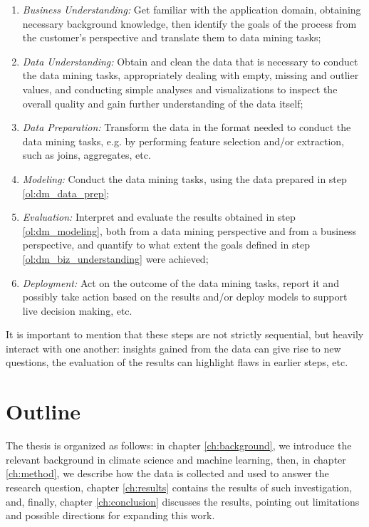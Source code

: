 \documentclass[a4paper]{book}
\begin{document}
\begin{enumerate}
\item \emph{Business Understanding:} Get familiar with the application domain, obtaining necessary background knowledge, then identify the goals of the process from the customer's perspective and translate them to data mining tasks;
\label{ol:dm_biz_understanding}

\item \emph{Data Understanding:} Obtain and clean the data that is necessary to conduct the data mining tasks, appropriately dealing with empty, missing and outlier values, and conducting simple analyses and visualizations to inspect the overall quality and gain further understanding of the data itself;
\label{ol:dm_data_understanding}

\item \emph{Data Preparation:} Transform the data in the format needed to conduct the data mining tasks, e.g. by performing feature selection and/or extraction, such as joins, aggregates, etc.
\label{ol:dm_data_prep}

\item \emph{Modeling:} Conduct the data mining tasks, using the data prepared in step \ref{ol:dm_data_prep};
\label{ol:dm_modeling}

\item \emph{Evaluation:} Interpret and evaluate the results obtained in step \ref{ol:dm_modeling}, both from a data mining perspective and from a business perspective, and quantify to what extent the goals defined in step \ref{ol:dm_biz_understanding} were achieved;
\label{ol:dm_eval}

\item \emph{Deployment:} Act on the outcome of the data mining tasks, report it and possibly take action based on the results and/or deploy models to support live decision making, etc.
\label{ol:deploy}
\end{enumerate}

It is important to mention that these steps are not strictly sequential, but heavily interact with one another: insights gained from the data can give rise to new questions, the evaluation of the results can highlight flaws in earlier steps, etc.


\section{Outline}
\label{sec:outline}
The thesis is organized as follows: in chapter \ref{ch:background}, we introduce the relevant background in climate science and machine learning, then, in chapter \ref{ch:method}, we describe how the data is collected and used to answer the research question, chapter \ref{ch:results} contains the results of such investigation, and, finally, chapter \ref{ch:conclusion} discusses the results, pointing out limitations and possible directions for expanding this work.
\end{document}
